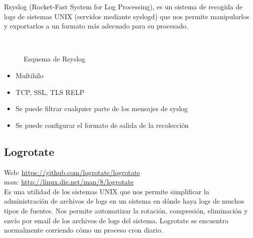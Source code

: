 Rsyslog (Rocket-Fast System for Log Processing), es un sistema de recogida de logs de sistemas UNIX (servidos mediante syslogd) que nos permite manipularlos y exportarlos a un formato más adecuado para su procesado.\\
\begin{figure}[H]
  \\
  \caption{Esquema de Rsyslog}
\end{figure}

\begin{itemize}
\item Multihilo
\item TCP, SSL, TLS RELP
\item Se puede filtrar cualquier parte de los mensajes de syslog
\item Se puede configurar el formato de salida de la recolección
\end{itemize}

\subsection{Logrotate}
\label{subsection:logrotate}

Web: \url{https://github.com/logrotate/logrotate}\\
man: \url{http://linux.die.net/man/8/logrotate}\\

Es una utilidad de los sistemas UNIX que nos permite simplificar la administración de archivos de logs en un sistema en dónde haya logs de muchos tipos de fuentes. Nos permite automatizar la rotación, compresión, eliminación y envío por email de los archivos de logs del sistema. Logrotate se encuentra normalmente corriendo cómo un proceso cron diario. \\


